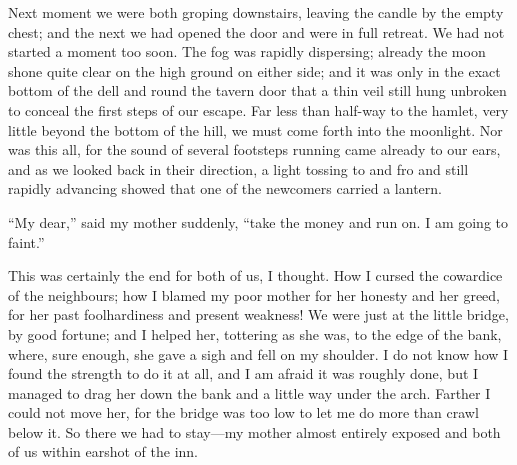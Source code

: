 Next moment we were both groping downstairs, leaving the candle by the empty chest; and the next we had opened the door and were in full retreat. We had not started a moment too soon. The fog was rapidly dispersing; already the moon shone quite clear on the high ground on either side; and it was only in the exact bottom of the dell and round the tavern door that a thin veil still hung unbroken to conceal the first steps of our escape. Far less than half-way to the hamlet, very little beyond the bottom of the hill, we must come forth into the moonlight. Nor was this all, for the sound of several footsteps running came already to our ears, and as we looked back in their direction, a light tossing to and fro and still rapidly advancing showed that one of the newcomers carried a lantern.

\enquote{My dear,} said my mother suddenly, \enquote{take the money and run on. I am going to faint.}

This was certainly the end for both of us, I thought. How I cursed the cowardice of the neighbours; how I blamed my poor mother for her honesty and her greed, for her past foolhardiness and present weakness! We were just at the little bridge, by good fortune; and I helped her, tottering as she was, to the edge of the bank, where, sure enough, she gave a sigh and fell on my shoulder. I do not know how I found the strength to do it at all, and I am afraid it was roughly done, but I managed to drag her down the bank and a little way under the arch. Farther I could not move her, for the bridge was too low to let me do more than crawl below it. So there we had to stay---my mother almost entirely exposed and both of us within earshot of the inn.
